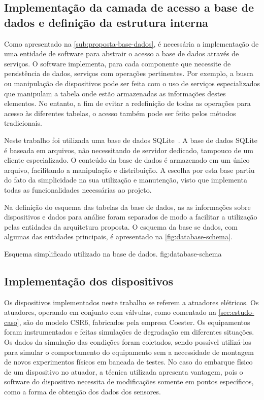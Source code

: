 \subsection{Implementação da camada de acesso a base de dados e definição da estrutura interna}

Como apresentado na \cref{sub:proposta-base-dados}, é necessária a implementação de uma entidade de
software para abstrair o acesso a base de dados através de serviços. O software implementa, para
cada componente que necessite de persistência de dados, serviços com operações pertinentes. Por
exemplo, a busca ou manipulação de dispositivos pode ser feita com o uso de serviços especializados
que manipulam a tabela onde estão armazenadas as informações destes elementos. No entanto, a fim de
evitar a redefinição de todas as operações para acesso às diferentes tabelas, o acesso também pode
ser feito pelos métodos tradicionais.

Neste trabalho foi utilizada uma base de dados SQLite~\cite{sqlite2013homepage}. A base de dados
SQLite é baseada em arquivos, não necessitando de servidor dedicado, tampouco de um cliente
especializado. O conteúdo da base de dados é armazenado em um único arquivo, facilitando a
manipulação e distribuição. A escolha por esta base partiu do fato da simplicidade na sua utilização
e manutenção, visto que implementa todas as funcionalidades necessárias ao projeto.

Na definição do esquema das tabelas da base de dados, as as informações sobre dispositivos e dados
para análise foram separados de modo a facilitar a utilização pelas entidades da arquitetura
proposta. O esquema da base se dados, com algumas das entidades principais, é apresentado na
\cref{fig:database-schema}.

  {Esquema simplificado utilizado na base de dados.}
  {fig:database-schema}


\subsection{Implementação dos dispositivos}

Os dispositivos implementados neste trabalho se referem a atuadores elétricos. Os atuadores,
operando em conjunto com válvulas, como comentado na \cref{sec:estudo-caso}, são do modelo CSR6,
fabricados pela empresa Coester. Os equipamentos foram instrumentados e feitas simulações de
degradação em diferentes situações. Os dados da simulação das condições foram coletados, sendo
possível utilizá-los para simular o comportamento do equipamento sem a necessidade de montagem de
novos experimentos físicos em bancada de testes. No caso do embarque físico de um dispositivo no
atuador, a técnica utilizada apresenta vantagem, pois o software do dispositivo necessita de
modificações somente em pontos específicos, como a forma de obtenção dos dados dos sensores.

